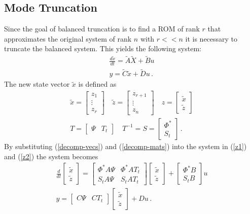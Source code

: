 \subsection{Mode Truncation}
Since the goal of balanced truncation is to find a ROM of rank \(r\) that approximates the original system of rank \(n\) with \(r << n\) it is necessary to truncate the balanced system.
This yields the following system:
\begin{gather}
\frac{d\tilde{x}}{dt} = \tilde{A}\tilde{X} + \tilde{B}u \\
y = \tilde{C}\tilde{x} + \tilde{D}u  \,.
\end{gather}
The new state vector \(\tilde{x}\) is defined as
\begin{gather}
\tilde{x} = \begin{bmatrix}
z_1 \\
\vdots \\
z_r
\end{bmatrix} \quad 
\tilde{z} = \begin{bmatrix}
z_{r+1} \\
\vdots \\
z_n
\end{bmatrix} \quad
z = \begin{bmatrix}
\tilde{x} \\
\tilde{z}
\end{bmatrix} \label{decomp-vecs}\\
T = \begin{bmatrix}
\Psi & T_t
\end{bmatrix} \quad
T^{-1} = S = \begin{bmatrix}
\Phi^{*} \\
S_t
\end{bmatrix}  \,. \label{decomp-mats}
\end{gather}
By substituting (\ref{decomp-vecs}) and (\ref{decomp-mats}) into the system in (\ref{z1}) and (\ref{z2}) the system becomes
\begin{gather}
\frac{d}{dt} \begin{bmatrix}
\tilde{x} \\
\tilde{z}
\end{bmatrix} = \begin{bmatrix}
\Phi^{*}A\Psi & \Phi^{*}AT_t \\
S_tA\Psi & S_tAT_t
\end{bmatrix} \begin{bmatrix}
\tilde{x} \\
\tilde{z}
\end{bmatrix}
+ \begin{bmatrix}
\Phi^{*}B \\
S_tB
\end{bmatrix} u \\
y = \begin{bmatrix}
C \Psi & CT_t
\end{bmatrix} \begin{bmatrix}
\tilde{x} \\
\tilde{z}
\end{bmatrix} + Du
 \,.
\end{gather}
